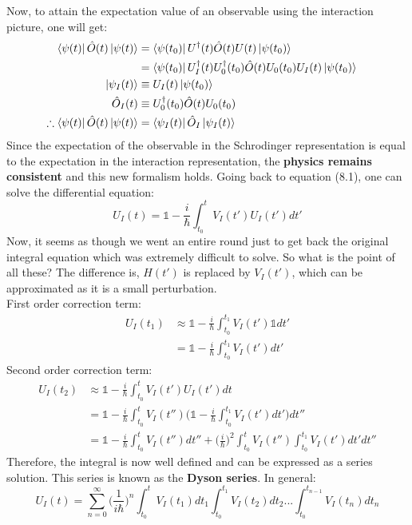 \documentclass{article}
\begin{document}
\begin{flushleft}
Now, to attain the expectation value of an observable using the interaction picture, one will get:
\begin{align*}
    \bra{\psi(t)}\hat{O}(t)\ket{\psi(t)}&=\bra{\psi(t_0)}U^\dagger(t)\hat{O}(t)U(t)\ket{\psi(t_0)}\\
    &=\bra{\psi(t_0)}U_I^\dagger(t)U_0^\dagger(t_0)\hat{O}(t)U_0(t_0)U_I(t)\ket{\psi(t_0)}\\
    \ket{\psi_I(t)}&\equiv U_I(t)\ket{\psi(t_0)}&\\
    \hat{O}_I(t)&\equiv U_0^\dagger(t_0)\hat{O}(t)U_0(t_0)\\
    \therefore \bra{\psi(t)}\hat{O}(t)\ket{\psi(t)}&=\bra{\psi_I(t)}\hat{O}_I\ket{\psi_I(t)}
\end{align*}
Since the expectation of the observable in the Schrodinger representation is equal to the expectation in the interaction representation, the \textbf{physics remains consistent} and this new formalism holds. Going back to equation (8.1), one can solve the differential equation:
$$U_I(t)=\mathbb{1}-\frac{i}{\hbar}\int_{t_0}^tV_I(t')U_I(t')dt'$$
Now, it seems as though we went an entire round just to get back the original integral equation which was extremely difficult to solve. So what is the point of all these? The difference is, $H(t')$ is replaced by $V_I(t')$, which can be approximated as it is a small perturbation.\\
First order correction term:
\begin{align*}
    U_I(t_1)&\approx\mathbb{1}-\frac{i}{\hbar}\int_{t_0}^{t_1}V_I(t')\mathbb{1}dt'\\
    &=\mathbb{1}-\frac{i}{\hbar}\int_{t_0}^{t_1}V_I(t')dt'
\end{align*}
Second order correction term:
\begin{align*}
    U_I(t_2)&\approx\mathbb{1}-\frac{i}{\hbar}\int_{t_0}^tV_I(t')U_I(t')dt\\
    &=\mathbb{1}-\frac{i}{\hbar}\int_{t_0}^tV_I(t'')\bigg(\mathbb{1}-\frac{i}{\hbar}\int_{t_0}^{t_1}V_I(t')dt'\bigg)dt''\\
    &=\mathbb{1}-\frac{i}{\hbar}\int_{t_0}^tV_I(t'')dt''+\bigg(\frac{i}{\hbar}\bigg)^2\int_{t_0}^tV_I(t'')\int_{t_0}^{t_1}V_I(t')dt'dt''
\end{align*}
Therefore, the integral is now well defined and can be expressed as a series solution. This series is known as the \textbf{Dyson series}. In general:
$$U_I(t)=\sum_{n=0}^\infty \bigg(\frac{1}{i\hbar}\bigg)^n\int_{t_0}^tV_I(t_1)dt_1\int_{t_0}^{t_1}V_I(t_2)dt_2...\int_{t_0}^{t_{n-1}}V_I(t_n)dt_n$$

\end{flushleft}
\end{document}

